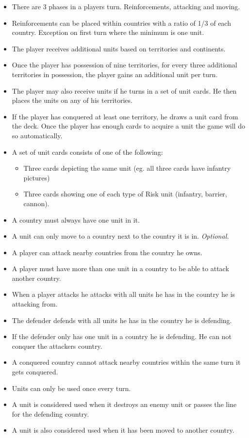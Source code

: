 \documentclass[12pt,a4paper]{article}
\begin{document}
\begin{itemize}
\item There are 3 phases in a players turn. Reinforcements, attacking
  and moving.
\item Reinforcements can be placed within countries with a ratio of
  1/3 of each country. Exception on first turn where the minimum is
  one unit.
\item The player receives additional units based on territories and
  continents.
\item Once the player has possession of nine territories, for every
  three additional territories in possession, the player gains an
  additional unit per turn.
\item The player may also receive units if he turns in a set of unit
  cards. He then places the units on any of his territories.
\item If the player has conquered at least one territory, he draws a
  unit card from the deck. Once the player has enough cards to acquire
  a unit the game will do so automatically.
\item A set of unit cards consists of one of the following:
  \begin{itemize}
  \item Three cards depicting the same unit (eg. all three cards have
    infantry pictures)
  \item Three cards showing one of each type of Risk unit (infantry,
    barrier, cannon).
  \end{itemize}
\item A country must always have one unit in it.
\item A unit can only move to a country next to the country it is
  in. \emph{Optional.}
\item A player can attack nearby countries from the country he owns.
\item A player must have more than one unit in a country to be able to
  attack another country.
\item When a player attacks he attacks with all units he has in the
  country he is attacking from.
\item The defender defends with all units he has in the country he is defending.
\item If the defender only has one unit in a country he is
  defending. He can not conquer the attackers country.
\item A conquered country cannot attack nearby countries within the
  same turn it gets conquered.
\item Units can only be used once every turn.
\item A unit is considered used when it destroys an enemy unit or
  passes the line for the defending country.
\item A unit is also considered used when it has been moved to another
  country.
\end{itemize}
\end{document}

